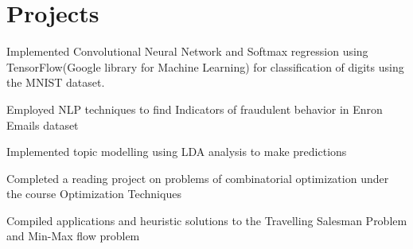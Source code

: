 \documentclass[]{deedy-resume-openfont}
\begin{document}
\hfill
\begin{minipage}[t]{0.66\textwidth} 


\section{Projects}

\vspace{\topsep} %
\begin{tightemize}\item Implemented Convolutional Neural Network and Softmax regression using TensorFlow(Google library for Machine Learning) for classification of digits using the MNIST dataset.
\end{tightemize}
\sectionsep

\begin{tightemize}
\item Employed NLP techniques to find Indicators of fraudulent behavior in Enron Emails dataset \item Implemented topic modelling using LDA analysis to make predictions\end{tightemize}
\sectionsep

\begin{tightemize}
\item Completed a reading project on problems of combinatorial optimization under the course Optimization Techniques\item Compiled applications and heuristic solutions to the Travelling Salesman Problem and Min-Max flow problem\end{tightemize}
\sectionsep




\end{minipage}
\end{document}
